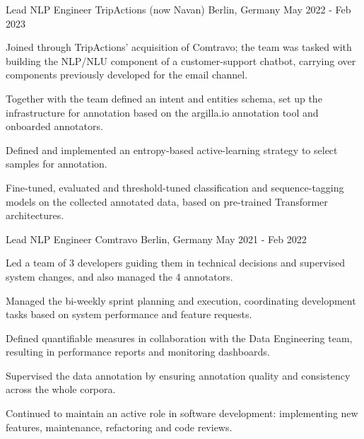 \begin{cventries}

  \cventry
    {Lead NLP Engineer} %
    {TripActions (now Navan)} %
    {Berlin, Germany} %
    {May 2022 - Feb 2023} %
	{
      \begin{cvitems} %
		\item {Joined through TripActions' acquisition of Comtravo; the team was tasked with building the NLP/NLU component of a customer-support chatbot, carrying over components previously developed for the email channel.}
		\item {Together with the team defined an intent and entities schema, set up the infrastructure for annotation based on the argilla.io annotation tool and onboarded annotators.}
		\item {Defined and implemented an entropy-based active-learning strategy to select samples for annotation.}
		\item {Fine-tuned, evaluated and threshold-tuned classification and sequence-tagging models on the collected annotated data, based on pre-trained Transformer architectures.}
      \end{cvitems}
    }



\cventry
    {Lead NLP Engineer} 
    {Comtravo}
    {Berlin, Germany}
    {May 2021 - Feb 2022}
    {
      \begin{cvitems} 
		  \item {Led a team of 3 developers guiding them in technical decisions and supervised system changes, and also managed the 4 annotators.}
		  \item {Managed the bi-weekly sprint planning and execution, coordinating development tasks based on system performance and feature requests.}
		  \item {Defined quantifiable measures in collaboration with the Data Engineering team, resulting in performance reports and monitoring dashboards.}
		  \item {Supervised the data annotation by ensuring annotation quality and consistency across the whole corpora.}
		  \item {Continued to maintain an active role in software development: implementing new features, maintenance, refactoring and code reviews.}
        \end{cvitems}
 	}



\end{cventries}
